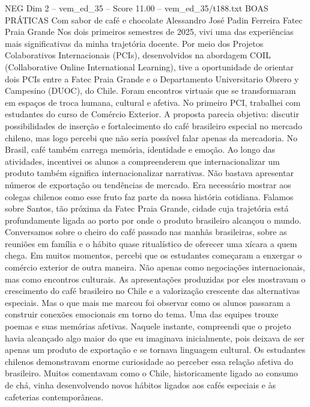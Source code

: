 \begin{textsample}{NEG Dim 2 – vem\_ed\_35 – Score 11.00 – vem\_ed\_35/t188.txt}  \label{ex:f2_neg_140}
BOAS PRÁTICAS Com sabor de café e chocolate Alessandro José Padin Ferreira Fatec Praia Grande Nos dois primeiros semestres de 2025, vivi uma das experiências mais significativas da minha trajetória docente.
Por meio dos Projetos Colaborativos Internacionais (PCIs), desenvolvidos na abordagem COIL (Collaborative Online International Learning), tive a oportunidade de orientar dois PCIs entre a Fatec Praia Grande e o Departamento Universitario Obrero y Campesino (DUOC), do Chile.
Foram encontros virtuais que se transformaram em espaços de troca humana, cultural e afetiva.
No primeiro PCI, trabalhei com estudantes do curso de Comércio Exterior.
A proposta parecia objetiva: discutir possibilidades de inserção e fortalecimento do café brasileiro especial no mercado chileno, mas logo percebi que não seria possível falar apenas da mercadoria.
No Brasil, café também carrega memória, identidade e emoção.
Ao longo das atividades, incentivei os alunos a compreenderem que internacionalizar um produto também significa internacionalizar narrativas.
Não bastava apresentar números de exportação ou tendências de mercado.
Era necessário mostrar aos colegas chilenos como esse fruto faz parte da nossa história cotidiana.
Falamos sobre Santos, tão próxima da Fatec Praia Grande, cidade cuja trajetória está profundamente ligada ao porto por onde o produto brasileiro alcançou o mundo.
Conversamos sobre o cheiro do café passado nas manhãs brasileiras, sobre as reuniões em família e o hábito quase ritualístico de oferecer uma xícara a quem chega.
Em muitos momentos, percebi que os estudantes começaram a enxergar o comércio exterior de outra maneira.
Não apenas como negociações internacionais, mas como encontros culturais.
As apresentações produzidas por eles mostravam o crescimento do café brasileiro no Chile e a valorização crescente das alternativas especiais.
Mas o que mais me marcou foi observar como os alunos passaram a construir conexões emocionais em torno do tema.
Uma das equipes trouxe poemas e suas memórias afetivas.
Naquele instante, compreendi que o projeto havia alcançado algo maior do que eu imaginava inicialmente, pois deixava de ser apenas um produto de exportação e se tornava linguagem cultural.
Os estudantes chilenos demonstravam enorme curiosidade ao perceber essa relação afetiva do brasileiro.
Muitos comentavam como o Chile, historicamente ligado ao consumo de chá, vinha desenvolvendo novos hábitos ligados aos cafés especiais e às cafeterias contemporâneas.

\end{textsample}

